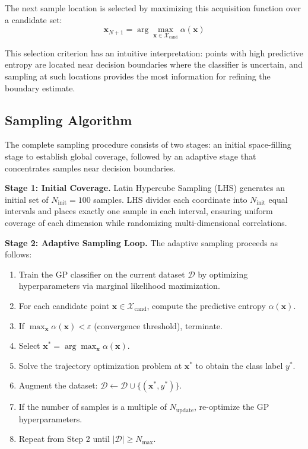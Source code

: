 \documentclass[a4paper,fleqn]{cas-dc}
\let\origsubsection\subsection
\renewcommand{\subsection}{\FloatBarrier\origsubsection}
\begin{document}
The next sample location is selected by maximizing this acquisition function over a candidate set:
\begin{equation}
\mathbf{x}_{N+1} = \arg\max_{\mathbf{x} \in \mathcal{X}_{\text{cand}}} \alpha(\mathbf{x})
\end{equation}

This selection criterion has an intuitive interpretation: points with high predictive entropy are located near decision boundaries where the classifier is uncertain, and sampling at such locations provides the most information for refining the boundary estimate.

\subsection{Sampling Algorithm}

The complete sampling procedure consists of two stages: an initial space-filling stage to establish global coverage, followed by an adaptive stage that concentrates samples near decision boundaries.

\textbf{Stage 1: Initial Coverage.} Latin Hypercube Sampling (LHS) generates an initial set of $N_{\text{init}} = 100$ samples. LHS divides each coordinate into $N_{\text{init}}$ equal intervals and places exactly one sample in each interval, ensuring uniform coverage of each dimension while randomizing multi-dimensional correlations.

\textbf{Stage 2: Adaptive Sampling Loop.} The adaptive sampling proceeds as follows:

\begin{enumerate}
\item Train the GP classifier on the current dataset $\mathcal{D}$ by optimizing hyperparameters via marginal likelihood maximization.

\item For each candidate point $\mathbf{x} \in \mathcal{X}_{\text{cand}}$, compute the predictive entropy $\alpha(\mathbf{x})$.

\item If $\max_{\mathbf{x}} \alpha(\mathbf{x}) < \varepsilon$ (convergence threshold), terminate.

\item Select $\mathbf{x}^* = \arg\max_{\mathbf{x}} \alpha(\mathbf{x})$.

\item Solve the trajectory optimization problem at $\mathbf{x}^*$ to obtain the class label $y^*$.

\item Augment the dataset: $\mathcal{D} \leftarrow \mathcal{D} \cup \{(\mathbf{x}^*, y^*)\}$.

\item If the number of samples is a multiple of $N_{\text{update}}$, re-optimize the GP hyperparameters.

\item Repeat from Step 2 until $|\mathcal{D}| \geq N_{\max}$.
\end{enumerate}
\end{document}
